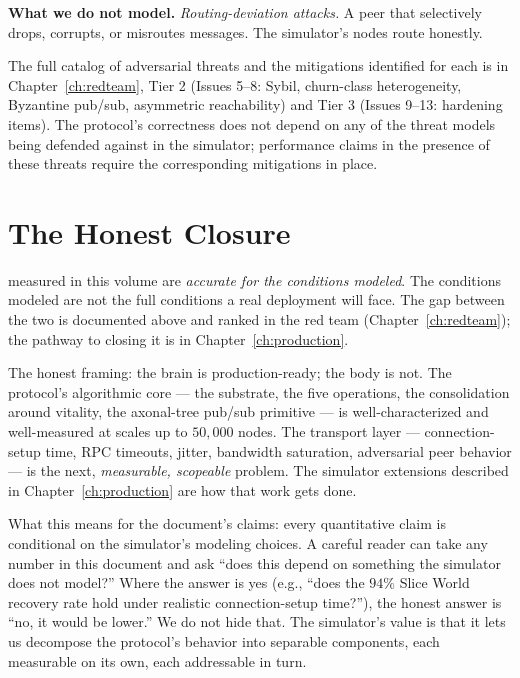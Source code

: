 \documentclass[twoside,nobib]{tufte-book}
\begin{document}
\textbf{What we do not model.} \emph{Routing-deviation attacks.}
A peer that selectively drops, corrupts, or misroutes messages.
The simulator's nodes route honestly.

The full catalog of adversarial threats and the mitigations
identified for each is in Chapter~\ref{ch:redteam}, Tier 2 (Issues
5--8: Sybil, churn-class heterogeneity, Byzantine pub/sub,
asymmetric reachability) and Tier 3 (Issues 9--13: hardening
items). The protocol's correctness does not depend on any of
the threat models being defended against in the simulator;
performance claims in the presence of these threats require
the corresponding mitigations in place.

\section{The Honest Closure}

 measured in this volume are
\emph{accurate for the conditions modeled}. The conditions
modeled are not the full conditions a real deployment will
face. The gap between the two is documented above and ranked in
the red team (Chapter~\ref{ch:redteam}); the pathway to closing
it is in Chapter~\ref{ch:production}.

The honest framing: the brain is production-ready; the body is
not. The protocol's algorithmic core --- the substrate, the
five operations, the consolidation around vitality, the
axonal-tree pub/sub primitive --- is well-characterized and
well-measured at scales up to $50{,}000$ nodes. The transport
layer --- connection-setup time, RPC timeouts, jitter,
bandwidth saturation, adversarial peer behavior --- is the next,
\emph{measurable, scopeable} problem. The simulator extensions
described in Chapter~\ref{ch:production} are how that work
gets done.

What this means for the document's claims: every quantitative
claim is conditional on the simulator's modeling choices. A
careful reader can take any number in this document and ask
``does this depend on something the simulator does not model?''
Where the answer is yes (e.g., ``does the $94\%$ Slice World
recovery rate hold under realistic connection-setup time?''), the
honest answer is ``no, it would be lower.'' We do not hide that.
The simulator's value is that it lets us decompose the protocol's
behavior into separable components, each measurable on its own,
each addressable in turn.
\end{document}
